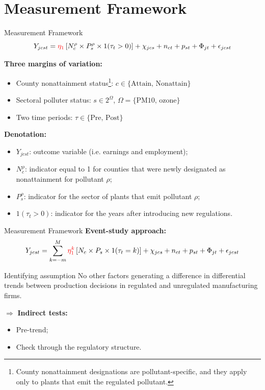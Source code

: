 \documentclass{beamer}
\begin{document}
\section{Measurement Framework}
\begin{frame}[shrink]
	\transfade %
	\tableofcontents[sectionstyle=show/shaded,subsectionstyle=show/shaded/hide]
	\addtocounter{framenumber}{-1}
\end{frame}
\begin{frame}{Measurement Framework}
	\begin{equation}
		Y_{jcst} = {\color{red}\eta_1}\left[N_c^\rho\times P_s^\rho\times 1(\tau_t>0)\right]+\chi_{jcs}+n_{ct}+p_{st}+\Phi_{jt}+\epsilon_{jcst}
	\end{equation}

	\textbf{Three margins of variation:}
	\begin{itemize}
		\item County nonattainment status\footnote{County nonattainment designations are pollutant-specific, and they apply only to plants that emit the regulated pollutant.}: $c\in \mbox{\{Attain, Nonattain\}}$
		\item Sectoral polluter status: $s\in 2^\Omega$, $ \Omega = \mbox{\{PM10, ozone\}}$
		\item Two time periods: $\tau\in\mbox{\{Pre, Post\}}$
	\end{itemize}
	\textbf{Denotation:}
	\begin{itemize}
		\item $Y_{jcst}$: outcome variable (i.e. earnings and employment);
		\item $N_c^\rho$: indicator equal to 1 for counties that were newly designated as nonattainment for pollutant $\rho$;
		\item $P_s^\rho$: indicator for the sector of plants that emit pollutant $\rho$;
		\item $1(\tau_t>0)$: indicator for the years after introducing new regulations.
	\end{itemize}
\end{frame}
\begin{frame}{Measurement Framework}
	\textbf{Event-study approach:}
	\begin{equation}
		Y_{jcst} = \sum_{k=-m}^M{\color{red}\eta_1^k}\left[N_c\times P_s\times 1(\tau_t=k)\right]+\chi_{jcs}+n_{ct}+p_{st}+\Phi_{jt}+\epsilon_{jcst}
	\end{equation}
	\begin{block}{Identifying assumption}
		No other factors generating a difference in differential trends between production decisions in regulated and unregulated manufacturing firms.
	\end{block}
	$\Rightarrow$ \textbf{Indirect tests:}
	\begin{itemize}
		\item Pre-trend;
		\item Check through the regulatory structure.
	\end{itemize}
\end{frame}
\end{document}
